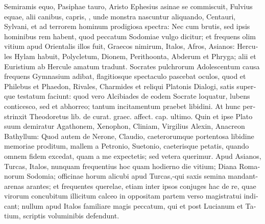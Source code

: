 \begin{latin}
Semiramis equo, Pasiphae tauro, Aristo Ephesius asinae se commiscuit,
Fulvius equae, alii canibus, capris, \etc{}, unde monstra nascuntur
aliquando, Centauri, Sylvani, et ad terrorem hominum prodigiosa
spectra: Nec cum brutis, sed ipsis hominibus rem habent, quod peccatum
Sodomiae vulgo dicitur; et frequens olim vitium apud Orientalis illos
fuit, Graecos nimirum, Italos, Afros, Asianos: Hercules Hylam
habuit, Polycletum, Dionem, Perithoonta, Abderum et Phryga; alii et
Euristium ab Hercule amatum tradunt. Socrates pulchrorum Adolescentum
causa frequens Gymnasium adibat, flagitiosque spectaculo pascebat
oculos, quod et Philebus et Phaedon, Rivales, Charmides et
reliqui Platonis Dialogi, satis superque testatum faciunt: quod
vero Alcibiades de eodem Socrate loquatur, lubens conticesco, sed et
abhorreo; tantum incitamentum praebet libidini. At hunc perstrinxit
Theodoretus lib. de curat. graec. affect. cap. ultimo. Quin et ipse
Plato suum demiratur Agathonem, Xenophon, Cliniam, Virgilius Alexin,
Anacreon Bathyllum: Quod autem de Nerone, Claudio, caeterorumque
portentosa libidine memoriae proditum, mallem a Petronio, Suetonio,
caeterisque petatis, quando omnem fidem excedat, quam a me expectetis;
sed vetera querimur. Apud Asianos, Turcas, Italos, nunquam
frequentius hoc quam hodierno die vitium; Diana Romanorum Sodomia;
officinae horum alicubi apud Turcas,-qui saxis semina mandant-arenas
arantes; et frequentes querelae, etiam inter ipsos conjuges hac de re,
quae virorum concubitum illicitum calceo in oppositam partem verso
magistratui indicant; nullum apud Italos familiare magis peccatum, qui
et post Lucianum et Tatium, scriptis voluminibis defendunt.


\end{latin}
